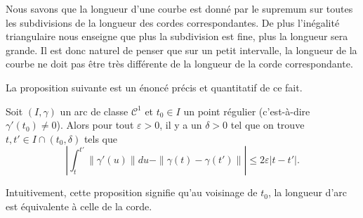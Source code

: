 Nous savons que la longueur d'une courbe est donné par le supremum sur toutes les subdivisions de la longueur des cordes correspondantes. De plus l'inégalité triangulaire nous enseigne que plus la subdivision est fine, plus la longueur sera grande. Il est donc naturel de penser que sur un petit intervalle, la longueur de la courbe ne doit pas être très différente de la longueur de la corde correspondante.

La proposition suivante est un énoncé précis et quantitatif de ce fait.
\begin{proposition}
    Soit $(I,\gamma)$ un arc de classe $\mathcal{C}^1$ et $t_0\in I$ un point régulier (c'est-à-dire $\gamma'(t_0)\neq 0$). Alors pour tout $\varepsilon>0$, il y a un $\delta>0$ tel que on trouve  $t,t'\in I\cap(t_0,\delta)$ tels que
    \begin{equation}
        \left| \int_t^{t'}\| \gamma'(u) \|du-\| \gamma(t)-\gamma(t') \| \right| \leq 2\varepsilon| t-t' |.
    \end{equation}
\end{proposition}
Intuitivement, cette proposition signifie qu'au voisinage de $t_0$, la longueur d'arc est équivalente à celle de la corde.

